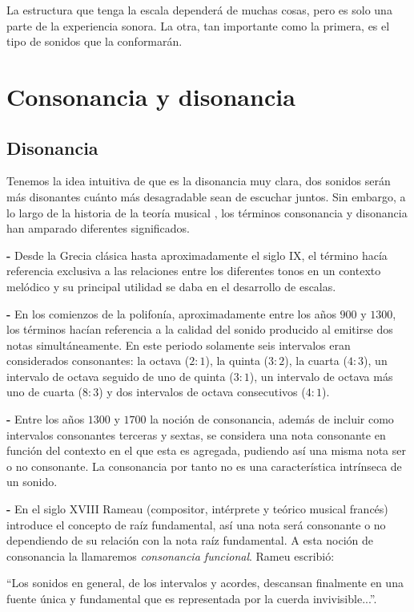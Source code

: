 \documentclass[11pt,a4paper]{article}
\begin{document}
	La estructura que tenga la escala dependerá de muchas cosas, pero es solo una parte de la experiencia sonora. La otra, tan importante como la primera, es el tipo de sonidos que la conformarán.
	
	
\newpage	
\section{Consonancia y disonancia}

	\subsection{Disonancia}
	
	Tenemos la idea intuitiva de que es la disonancia muy clara, dos sonidos serán más disonantes cuánto más desagradable sean de escuchar juntos. 
	Sin embargo, a lo largo de la historia de la teoría musical , los términos consonancia y disonancia han amparado diferentes significados.
	
	\textbf{-} Desde la Grecia clásica hasta aproximadamente el siglo IX, el término hacía referencia exclusiva a las relaciones entre los diferentes tonos en un contexto melódico y su principal utilidad se daba en el desarrollo de escalas.
	
	\textbf{-} En los comienzos de la polifonía, aproximadamente entre los años $900$ y $1300$, los términos hacían referencia a la calidad del sonido producido al emitirse dos notas simultáneamente. En este periodo solamente seis intervalos eran considerados consonantes: la octava ($2:1$), la quinta ($3:2$), la cuarta ($4:3$), un intervalo de octava seguido de uno de quinta ($3:1$),  un intervalo de octava más uno de cuarta ($8:3$) y dos intervalos de octava consecutivos ($4:1$).
	
	\textbf{-} Entre los años $1300$ y $1700$ la noción de consonancia, además de incluir como intervalos consonantes terceras y sextas, se considera una nota consonante en función del contexto en el que esta es agregada, pudiendo así una misma nota ser o no consonante. La consonancia por tanto no es una característica intrínseca de un sonido.
	
	\textbf{-} En el siglo XVIII Rameau (compositor, intérprete y teórico musical francés) introduce el concepto de raíz fundamental, así una nota será consonante o no dependiendo de su relación con la nota raíz fundamental. A esta noción de consonancia la llamaremos \emph{consonancia funcional}. Rameu escribió:
	
	\begin{center}
    	``Los sonidos en general, de los intervalos y acordes, descansan finalmente en una fuente única y fundamental que es representada por la cuerda  invivisible...''.
	\end{center}
		
\end{document}
